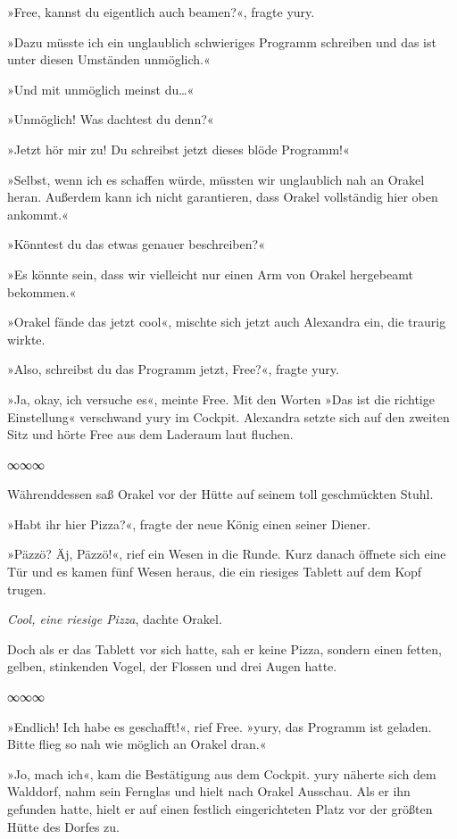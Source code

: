 »Free, kannst du eigentlich auch beamen?«, fragte yury.

»Dazu müsste ich ein unglaublich schwieriges Programm schreiben und das ist unter diesen Umständen unmöglich.«

»Und mit unmöglich meinst du…«

»Unmöglich! Was dachtest du denn?«

»Jetzt hör mir zu! Du schreibst jetzt dieses blöde Programm!«

»Selbst, wenn ich es schaffen würde, müssten wir unglaublich nah an Orakel heran. Außerdem kann ich nicht garantieren, dass Orakel vollständig hier oben ankommt.«

»Könntest du das etwas genauer beschreiben?«

»Es könnte sein, dass wir vielleicht nur einen Arm von Orakel hergebeamt bekommen.«

»Orakel fände das jetzt cool«, mischte sich jetzt auch Alexandra ein, die traurig wirkte.

»Also, schreibst du das Programm jetzt, Free?«, fragte yury.

»Ja, okay, ich versuche es«, meinte Free. Mit den Worten »Das ist die richtige Einstellung« verschwand yury im Cockpit. Alexandra setzte sich auf den zweiten Sitz und hörte Free aus dem Laderaum laut fluchen.

\begin{center}
    ∞∞∞
\end{center}

Währenddessen saß Orakel vor der Hütte auf seinem toll geschmückten Stuhl.

»Habt ihr hier Pizza?«, fragte der neue König einen seiner Diener.

»Päzzö? Äj, Päzzö!«, rief ein Wesen in die Runde. Kurz danach öffnete sich eine Tür und es kamen fünf Wesen heraus, die ein riesiges Tablett auf dem Kopf trugen.

\textit{Cool, eine riesige Pizza}, dachte Orakel.

Doch als er das Tablett vor sich hatte, sah er keine Pizza, sondern einen fetten, gelben, stinkenden Vogel, der Flossen und drei Augen hatte.

\begin{center}
    ∞∞∞
\end{center}

»Endlich! Ich habe es geschafft!«, rief Free. »yury, das Programm ist geladen. Bitte flieg so nah wie möglich an Orakel dran.«

»Jo, mach ich«, kam die Bestätigung aus dem Cockpit. yury näherte sich dem Walddorf, nahm sein Fernglas und hielt nach Orakel Ausschau. Als er ihn gefunden hatte, hielt er auf einen festlich eingerichteten Platz vor der größten Hütte des Dorfes zu.

